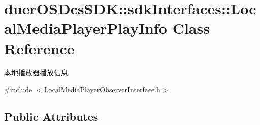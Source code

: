 \hypertarget{classduerOSDcsSDK_1_1sdkInterfaces_1_1LocalMediaPlayerPlayInfo}{}\section{duer\+O\+S\+Dcs\+S\+DK\+:\+:sdk\+Interfaces\+:\+:Local\+Media\+Player\+Play\+Info Class Reference}
\label{classduerOSDcsSDK_1_1sdkInterfaces_1_1LocalMediaPlayerPlayInfo}


本地播放器播放信息  




{\ttfamily \#include $<$Local\+Media\+Player\+Observer\+Interface.\+h$>$}

\subsection*{Public Attributes}
